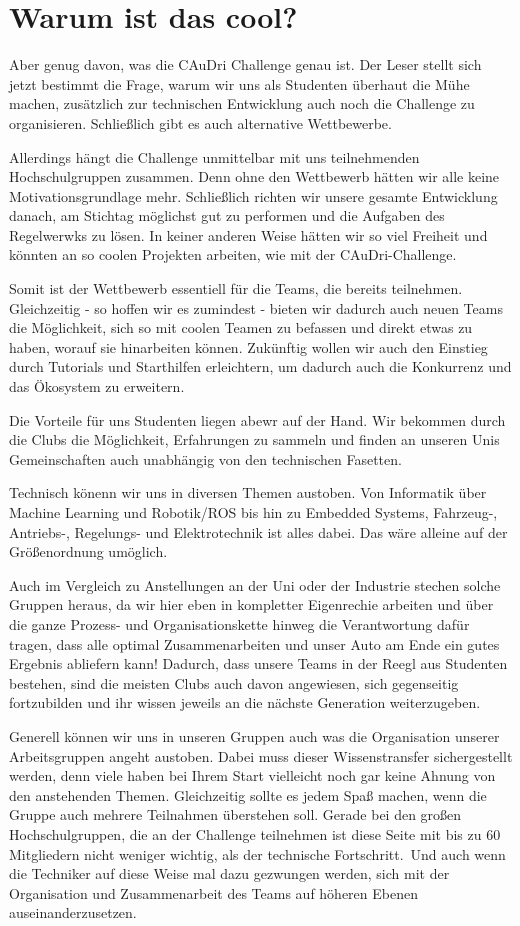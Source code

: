\section{Warum ist das cool?}
Aber genug davon, was die CAuDri Challenge genau ist. 
Der Leser stellt sich jetzt bestimmt die Frage, warum wir uns als Studenten überhaut die Mühe machen, zusätzlich zur technischen Entwicklung auch noch die Challenge zu organisieren.
Schließlich gibt es auch alternative Wettbewerbe.

Allerdings hängt die Challenge unmittelbar mit uns teilnehmenden 
Hochschulgruppen zusammen.
Denn ohne den Wettbewerb hätten wir alle keine Motivationsgrundlage mehr.
Schließlich richten wir unsere gesamte Entwicklung danach, am Stichtag 
möglichst gut zu performen und die Aufgaben des Regelwerwks zu lösen.
In keiner anderen Weise hätten wir so viel Freiheit und könnten an so coolen Projekten 
arbeiten, wie mit der CAuDri-Challenge.

Somit ist der Wettbewerb essentiell für die Teams, die bereits teilnehmen.
Gleichzeitig - so hoffen wir es zumindest - bieten wir dadurch auch neuen Teams
die Möglichkeit, sich so mit coolen Teamen zu befassen und direkt etwas zu haben,
worauf sie hinarbeiten können. Zukünftig wollen wir auch den Einstieg durch Tutorials
und Starthilfen erleichtern, um dadurch auch die Konkurrenz und das Ökosystem zu erweitern.

Die Vorteile für uns Studenten liegen abewr auf der Hand. Wir bekommen durch 
die Clubs die Möglichkeit, Erfahrungen zu sammeln und finden an unseren Unis Gemeinschaften
auch unabhängig von den technischen Fasetten. 

Technisch könenn wir uns in diversen Themen austoben.
Von Informatik über Machine Learning und Robotik/ROS bis hin zu
Embedded Systems, Fahrzeug-, Antriebs-, Regelungs- und Elektrotechnik
ist alles dabei. Das wäre alleine auf der Größenordnung umöglich.

Auch im Vergleich zu Anstellungen an der Uni oder der Industrie stechen solche
Gruppen heraus, da wir hier eben in kompletter Eigenrechie arbeiten und über
die ganze Prozess- und Organisationskette hinweg die Verantwortung dafür tragen, 
dass alle optimal Zusammenarbeiten und unser Auto am Ende ein gutes Ergebnis abliefern kann!
Dadurch, dass unsere Teams in der Reegl aus Studenten bestehen, sind die meisten Clubs
auch davon angewiesen, sich gegenseitig fortzubilden und ihr wissen jeweils 
an die nächste Generation weiterzugeben. 

Generell können wir uns in unseren Gruppen auch was die Organisation unserer
Arbeitsgruppen angeht austoben. Dabei muss dieser Wissenstransfer sichergestellt werden,
denn viele haben bei Ihrem Start vielleicht noch gar keine
Ahnung von den anstehenden Themen. Gleichzeitig sollte es jedem Spaß machen,
wenn die Gruppe auch mehrere Teilnahmen überstehen soll. 
Gerade bei den großen Hochschulgruppen, die an der Challenge teilnehmen ist diese
Seite mit bis zu 60 Mitgliedern nicht weniger wichtig, als der technische Fortschritt.\
Und auch wenn die Techniker auf diese Weise mal dazu gezwungen werden, sich
mit der Organisation und Zusammenarbeit des Teams auf höheren Ebenen auseinanderzusetzen.

